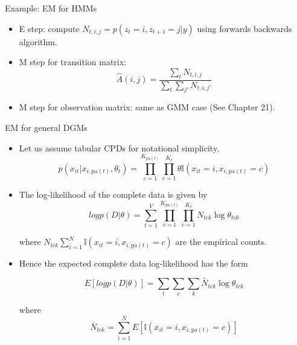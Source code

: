 \documentclass[10pt,mathserif]{beamer}
\begin{document}
\begin{frame}{Example: EM for HMMs}
\begin{itemize}
    \item E step: compute $N_{t,i,j} = p(z_{t} = i,z_{t+1} = j|y)$ using forwards backwards algorithm.
    \item M step for transition matrix:
    \begin{equation}
        \hat{A}(i,j) = \frac{\sum_t N_{t,i,j}}{\sum_t \sum_{j'}N_{t,i,j'}}
    \end{equation}
    
    \item M step for observation matrix: same as GMM case (See Chapter 21).
\end{itemize}
\end{frame}

\begin{frame}{EM for general DGMs}
\begin{itemize}
    \item Let us assume tabular CPDs for notational simplicity.
    \begin{equation}
        p(x_{it}|x_{i,\text{pa}(t)},\theta_{t}) =   \prod_{c=1}^{K_{\text{pa}(t)}}\prod_{c=1}^{K_t} \theta \mathbb{I}(x_{it}=i,x_{i,\text{pa}(t)}=c)
    \end{equation}
    
    \item The log-likelihood of the complete data is given by
    \begin{equation}
        log p(D|\theta) =  \sum_{t=1}^V  \prod_{c=1}^{K_{\text{pa}(t)}}\prod_{c=1}^{K_t}   N_{tck} \log \theta_{tck}
    \end{equation}    
    
    where $N_{tck} \sum_{i=1}^N \mathbb{I}(x_{it}=i,x_{i,\text{pa}(t)}=c)$ are the empirical counts.
    
    \item Hence the expected complete data log-likelihood has the form
    
    \begin{equation}
        E [log p(D|\theta)]  = \sum_t\sum_c\sum_k \bar{N}_{tck} \log \theta_{tck}
    \end{equation}
    
    where 
    \begin{equation}
        \bar{N}_{tck} = \sum_{i=1}^N E [\mathbb{I}(x_{it}=i,x_{i,\text{pa}(t)}=c)]
    \end{equation}
\end{itemize}
\end{frame}
\end{document}
